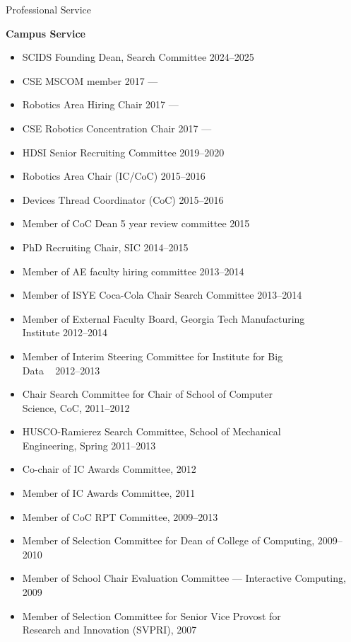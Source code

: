 \documentclass{article}
\begin{document}
\begin{cv}
\begin{cvlist}{Professional Service}
		\item {\bf Campus Service}
		\begin{itemize}
			\item SCIDS Founding Dean, Search Committee \cftdotfill{\cftdotsep} 2024--2025
			\item CSE MSCOM member \cftdotfill{\cftdotsep} 2017 ---
			\item Robotics Area Hiring Chair \cftdotfill{\cftdotsep} 2017 ---
			\item CSE Robotics Concentration Chair \cftdotfill{\cftdotsep}
			      2017 ---
			\item HDSI Senior Recruiting Committee  \cftdotfill{\cftdotsep} 2019--2020
			\item Robotics Area Chair (IC/CoC) \cftdotfill{\cftdotsep} 2015--2016
			\item Devices Thread Coordinator (CoC) \cftdotfill{\cftdotsep} 2015--2016
			\item Member of CoC Dean 5 year review committee
			      \cftdotfill{\cftdotsep} 2015
			\item PhD Recruiting Chair, SIC \cftdotfill{\cftdotsep} 2014--2015
			\item Member of AE faculty hiring committee \cftdotfill{\cftdotsep}
			      2013--2014
			\item Member of ISYE Coca-Cola Chair Search Committee
			      \cftdotfill{\cftdotsep} 2013--2014
			\item Member of External Faculty Board, Georgia Tech Manufacturing\\
			      Institute \cftdotfill{\cftdotsep} 2012--2014
			\item Member of Interim Steering Committee for Institute for Big
			      \\Data \ \cftdotfill{\cftdotsep} 2012--2013
			\item Chair Search Committee for Chair of School of Computer\\
			      Science, CoC, \cftdotfill{\cftdotsep} 2011--2012
			\item HUSCO-Ramierez Search Committee, School of Mechanical\\
			      Engineering, Spring \cftdotfill{\cftdotsep} 2011--2013
			\item Co-chair of IC Awards Committee, \cftdotfill{\cftdotsep} 2012
			\item Member of IC Awards Committee, \cftdotfill{\cftdotsep} 2011
			\item Member of CoC RPT Committee, \cftdotfill{\cftdotsep} 2009--2013
			\item Member of Selection Committee for Dean of College of
			      Computing, \cftdotfill{\cftdotsep} 2009--2010
			\item Member of School Chair Evaluation Committee --- Interactive
			      Computing, \cftdotfill{\cftdotsep} 2009
			\item Member of Selection Committee for Senior Vice Provost for \\
			      Research and Innovation (SVPRI), \cftdotfill{\cftdotsep} 2007
		\end{itemize}


\end{cvlist}
\end{cv}
\end{document}
